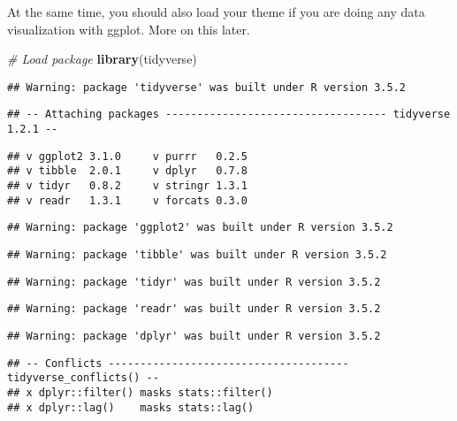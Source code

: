 \documentclass[]{article}
\newenvironment{Shaded}{\begin{snugshade}}{\end{snugshade}}
\newcommand{\KeywordTok}[1]{\textcolor[rgb]{0.13,0.29,0.53}{\textbf{#1}}}
\newcommand{\CommentTok}[1]{\textcolor[rgb]{0.56,0.35,0.01}{\textit{#1}}}
\newcommand{\NormalTok}[1]{#1}
\begin{document}
At the same time, you should also load your theme if you are doing any
data visualization with ggplot. More on this later.

\begin{Shaded}
\begin{Highlighting}[]
\CommentTok{# Load package}
\KeywordTok{library}\NormalTok{(tidyverse)}
\end{Highlighting}
\end{Shaded}

\begin{verbatim}
## Warning: package 'tidyverse' was built under R version 3.5.2
\end{verbatim}

\begin{verbatim}
## -- Attaching packages ----------------------------------- tidyverse 1.2.1 --
\end{verbatim}

\begin{verbatim}
## v ggplot2 3.1.0     v purrr   0.2.5
## v tibble  2.0.1     v dplyr   0.7.8
## v tidyr   0.8.2     v stringr 1.3.1
## v readr   1.3.1     v forcats 0.3.0
\end{verbatim}

\begin{verbatim}
## Warning: package 'ggplot2' was built under R version 3.5.2
\end{verbatim}

\begin{verbatim}
## Warning: package 'tibble' was built under R version 3.5.2
\end{verbatim}

\begin{verbatim}
## Warning: package 'tidyr' was built under R version 3.5.2
\end{verbatim}

\begin{verbatim}
## Warning: package 'readr' was built under R version 3.5.2
\end{verbatim}

\begin{verbatim}
## Warning: package 'dplyr' was built under R version 3.5.2
\end{verbatim}

\begin{verbatim}
## -- Conflicts -------------------------------------- tidyverse_conflicts() --
## x dplyr::filter() masks stats::filter()
## x dplyr::lag()    masks stats::lag()
\end{verbatim}
\end{document}
